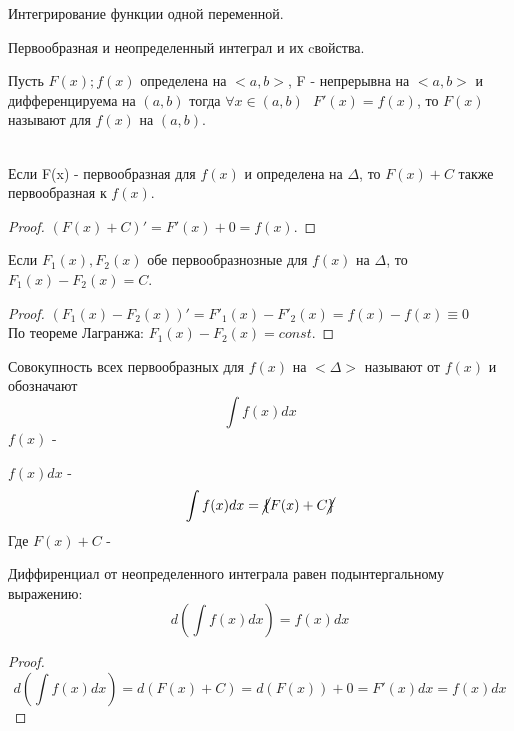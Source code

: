 \begin{title}
  Интегрирование функции одной переменной.
\end{title}

\begin{title}[\Large]
  Первообразная и неопределенный интеграл и их cвойства.
\end{title}

\begin{defin}[первообразной]
  Пусть $F(x); f(x)$ определена на $<a,b>$, F - непрерывна на $<a,b>$ и
  дифференцируема на $(a,b)$ тогда $\forall x \in (a, b) ~~~ F'(x) = f(x)$,
  то $F(x)$ называют  для $f(x)$ на $(a,b)$.
\end{defin}

\\
 Если F(x) - первообразная для $f(x)$ и определена на $\Delta$, то $F(x) + C$
также первообразная к $f(x)$.

\begin{proof}
  $(F(x) + C)' = F'(x) + 0 = f(x)$.
\end{proof}

 Если $F_{1}(x), F_{2}(x)$ обе первообразнозные для $f(x)$ на $\Delta$,
то $F_{1}(x) - F_{2}(x) = C$.

\begin{proof}
  $(F_{1}(x) - F_{2}(x))' = F'_{1}(x) - F'_{2}(x) = f(x) - f(x) \equiv 0$\\
  По теореме Лагранжа: $F_{1}(x) - F_{2}(x) = const$.
\end{proof}

\begin{defin}
  Совокупность всех первообразных для $f(x)$ на $<\Delta>$ называют
   от $f(x)$ и обозначают
  \[
  \int f(x)dx
  \]
  $f(x)$ - 

  $f(x)dx$ - 
  \[
  \int f(x)dx = \cancel{\{} F(x) + C \cancel{\}}
  \]
  Где $F(x) + C$ - 
\end{defin}

 Диффиренциал от неопределенного интеграла равен подынтергальному
выражению:
\[d \left ( \int f(x)dx \right ) = f(x)dx \]

\begin{proof}
  \[d \left ( \int f(x)dx \right ) = d(F(x) + C) = d(F(x)) + 0 = F'(x)dx
  = f(x)dx\]
\end{proof}

